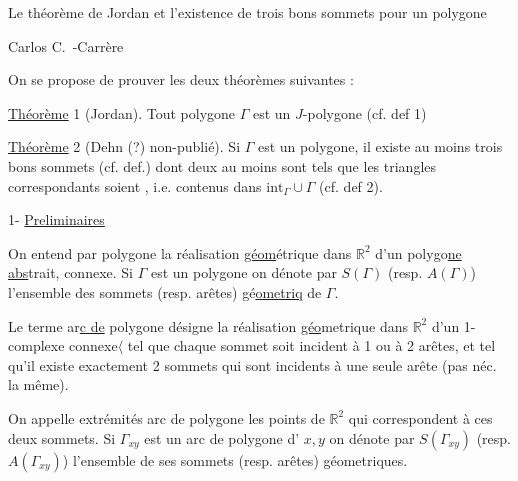 Le théorème de Jordan et l'existence de trois bons sommets pour un polygone 

\hspace*{\fill}Carlos C.~-Carrère\hspace*{\fill}

\margin{$\bullet$}On se propose de prouver les deux théorèmes suivantes :

\uline{Théorème} 1 (Jordan). Tout polygone $\Gamma$ est un $J$-polygone (cf. def 1)

\uline{Théorème} 2 (Dehn (?) non-publié). Si $\Gamma$ est un polygone, il existe au moins trois bons sommets (cf. def.\hspace{1em}) dont deux au moins sont tels que les triangles correspondants soient , i.e. contenus dans $\mathrm{int}_{\Gamma}\cup\Gamma$ (cf. def 2).

1- \uline{Preliminaires}

\margin{$\bullet\ \bullet$}On entend par polygone la réalisation \uline{géom}étrique dans \uline{$\mathbb{R}^{2}$} d'un \margin{$\bullet$}polygo\uline{ne abs}trait, connexe. Si $\Gamma$ est un polygone on dénote par \margin{$\bullet$}$S(\Gamma)$ (resp. $A(\Gamma)$) l'ensemble des sommets (resp. arêtes) gé\uline{ometriq} de $\Gamma$.

\margin{$\cdot\quad\cdot$}Le terme ar\uline{c de} polygone désigne la réalisation \uline{géo}metrique dans $\mathbb{R}^{2}$ d'un 1-complexe connexe$\langle$ tel que chaque sommet soit incident à 1 ou à 2 arêtes, et tel qu'il existe exactement 2 sommets qui sont incidents à une seule arête (pas néc. la même).

On appelle extrémités  arc de polygone les points de $\mathbb{R}^{2}$ qui correspondent à ces deux sommets. Si $\Gamma_{xy}$ est un arc de polygone d' $x,y$ on dénote par $S(\Gamma_{xy})$ (resp. $A(\Gamma_{xy})$) l'ensemble de ses sommets (resp. arêtes) géometriques.

